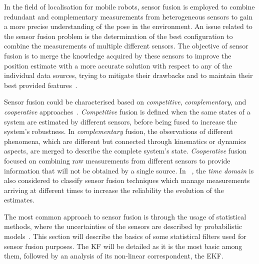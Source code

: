 \noindent
In the field of localisation for mobile robots, sensor fusion is employed to combine redundant and complementary measurements from heterogeneous sensors to gain a more precise understanding of the pose in the environment.
An issue related to the sensor fusion problem is the determination of the best configuration to combine the measurements of multiple different sensors.
The objective of sensor fusion is to merge the knowledge acquired by these sensors to improve the position estimate with a more accurate solution with respect to any of the individual data sources, trying to mitigate their drawbacks and to maintain their best provided features~\cite{mitchell_multi-sensor_2007}.

Sensor fusion could be characterised based on \textit{competitive}, \textit{complementary}, and \textit{cooperative} approaches~\cite{1199023}.
\textit{Competitive} fusion is defined when the same states of a system are estimated by different sensors, before being fused to increase the system's robustness.
In \textit{complementary} fusion, the observations of different phenomena, which are different but connected through kinematics or dynamics aspects, are merged to describe the complete system's state.
\textit{Cooperative} fusion focused on combining raw measurements from different sensors to provide information that will not be obtained by a single source.
In ~\cite{weckenmann_multisensor_2009}, the \textit{time domain} is also considered to classify sensor fusion techniques which manage measurements arriving at different times to increase the reliability the evolution of the estimates.


The most common approach to sensor fusion is through the usage of statistical methods, where the uncertainties of the sensors are described by probabilistic models~\cite{gustafsson_statistical_2010}.
This section will describe the basics of some statistical filters used for sensor fusion purposes.
The \gls{KF} will be detailed as it is the most basic among them, followed by an analysis of its non-linear correspondent, the \gls{EKF}. 

